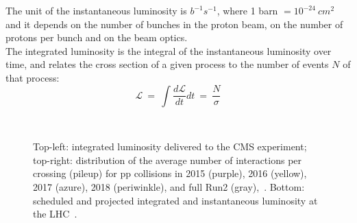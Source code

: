 The unit of the instantaneous luminosity is $b^{-1}s^{-1}$, where 1
barn $= 10^{-24} \ cm^2$ and it depends on the number of bunches in
the proton beam, on the number of protons per bunch and on the beam
optics. \\
The integrated luminosity is the integral of the instantaneous
luminosity over time, and relates the cross section of a
given process to the number of events $N$ of that process:
\begin{equation}
\label{eq:intelumi}
\mathcal{L} \:=\: \int \frac{d\mathcal{L}}{dt} dt \: = \: \frac{N}{\sigma}
\end{equation}


\begin{figure}[h]
  \noindent
  \\
  \caption{Top-left: integrated luminosity delivered to the CMS
    experiment; top-right: distribution of the average number of
    interactions per crossing (pileup) for pp collisions in 2015
    (purple), 2016 (yellow), 2017 (azure), 2018 (periwinkle), and
    full Run2 (gray),~\cite{webpage_lumi}. Bottom: scheduled and
    projected integrated and instantaneous luminosity at the LHC~\cite{webpage_lhc}.}
  \label{fig:lumi}
\end{figure}

